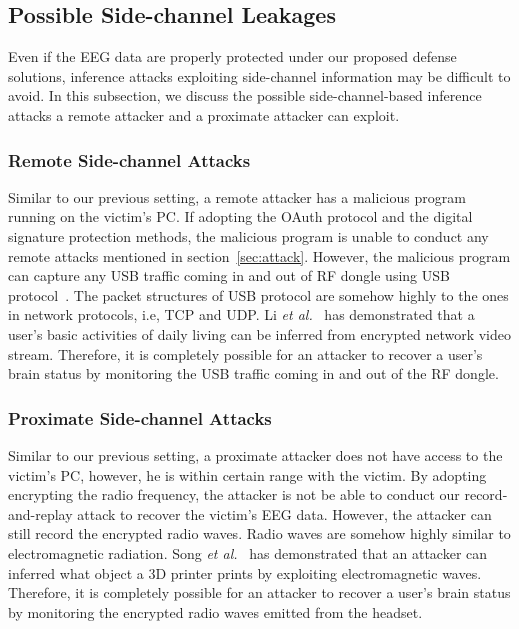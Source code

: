 {\color{blue}
\subsection{Possible Side-channel Leakages}
Even if the EEG data are properly protected under our proposed defense solutions, inference attacks exploiting side-channel information may be difficult to avoid. In this subsection, we discuss the possible side-channel-based inference attacks a remote attacker and a proximate attacker can exploit.

\subsubsection{Remote Side-channel Attacks}
Similar to our previous setting, a remote attacker has a malicious program running on the victim's PC. If adopting the OAuth protocol and the digital signature protection methods, the malicious program is unable to conduct any remote attacks mentioned in section~\ref{sec:attack}. However, the malicious program can capture any USB traffic coming in and out of RF dongle using USB protocol~\cite{usbprotocol}. The packet structures of USB protocol are somehow highly to the ones in network protocols, i.e, TCP and UDP. Li \emph{et al.}~\cite{li2016side} has demonstrated that a user's basic activities of daily living can be inferred from encrypted network video stream. Therefore, it is completely possible for an attacker to recover a user's brain status by monitoring the USB traffic coming in and out of the RF dongle.

\subsubsection{Proximate Side-channel Attacks}
Similar to our previous setting, a proximate attacker does not have access to the victim's PC, however, he is within certain range with the victim. By adopting encrypting the radio frequency, the attacker is not be able to conduct our record-and-replay attack to recover the victim's EEG data. However, the attacker can still record the encrypted radio waves. Radio waves are somehow highly similar to electromagnetic radiation. Song \emph{et al.}~\cite{song2016my} has demonstrated that an attacker can inferred what object a 3D printer prints by exploiting electromagnetic waves. Therefore, it is completely possible for an attacker to recover a user's brain status by monitoring the encrypted radio waves emitted from the headset.
}
